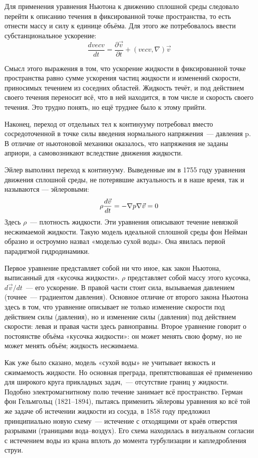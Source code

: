 Для применения уравнения Ньютона к движению сплошной среды следовало перейти к описанию течения в фиксированной точке пространства, то есть отнести массу и силу к единице объёма. Для этого же потребовалось ввести субстанциональное ускорение:
$$
\frac{d vec v}{d t} = \frac{\partial \vec v}{\partial t} + (vec v, \nabla) \vec v
$$

Смысл этого выражения в том, что ускорение жидкости в фиксированной точке пространства равно сумме ускорения частиц жидкости и изменений скорости, приносимых течением из соседних областей. Жидкость течёт, и под действием своего течения переносит всё, что в ней находится, в том числе и скорость своего течения. Это трудно понять, но ещё труднее было к этому прийти.

Наконец, переход от отдельных тел к континууму потребовал вместо сосредоточенной в точке силы введения нормального напряжения~--- давления p. В отличие от ньютоновой механики оказалось, что напряжения не заданы априори, а самовозникают вследствие движения жидкости.

Эйлер выполнил переход к континууму. Выведенные им в 1755 году уравнения движения сплошной среды, не потерявшие актуальность и в наше время, так и называются — эйлеровыми:
$$
\rho \frac{d \vec v}{d t} = - \nabla p \\
\nabla \vec v = 0
\label{3}
$$
Здесь $\rho$~--- плотность жидкости. Эти уравнения описывают течение невязкой несжимаемой жидкости. Такую модель идеальной сплошной среды фон Нейман образно и остроумно назвал «моделью сухой воды». Она явилась первой парадигмой гидродинамики.

Первое уравнение представляет собой ни что иное, как закон Ньютона, выписанный для «кусочка жидкости». $\rho$ представляет собой массу этого кусочка, $ d \vec{v} / dt$~--- его ускорение. В правой части стоит сила, вызываемая давлением (точнее~--- градиентом давления). Основное отличие от второго закона Ньютона здесь в том, что уравнение описывает не только изменение скорости под действием силы (давления), но и изменение силы (давления) под действием скорости: левая и правая части здесь равноправны. Второе уравнение говорит о постоянстве объёма «кусочка жидкости»: он может менять свою форму, но не может менять объём; жидкость несжимаема.

Как уже было сказано, модель «сухой воды» не учитывает вязкость и сжимаемость жидкости. Но основная преграда, препятствовавшая её применению для широкого круга прикладных задач,~--- отсутствие границ у жидкости. Подобно электромагнитному полю течение занимает всё пространство. Герман фон Гельмгольц (1821--1894), пытаясь применить эйлеровы уравнения ко всё той же задаче об истечении жидкости из сосуда, в 1858 году предложил принципиально новую схему~--- истечение с отходящими от краёв отверстия разрывами (границами вода--воздух). Его схема находилась в визуальном согласии с истечением воды из крана вплоть до момента турбулизации и капледробления струи.

